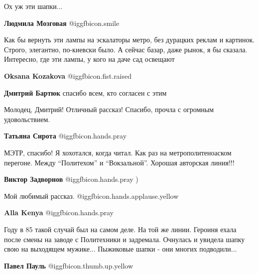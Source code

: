  
 
 
 
 
\zzSecCmt

\begin{itemize} %
Ох уж эти шапки...

\textbf{Людмила Мозговая}  @igg{fbicon.smile} 


Как бы вернуть эти лампы на эскалаторы метро, без дурацких реклам и картинок.
Строго, элегантно, по-киевски было. А сейчас базар, даже рынок, я бы сказала.
Интересно, где эти лампы, у кого на даче сад освещают

\begin{itemize} %
\textbf{Oksana Kozakova}  @igg{fbicon.fist.raised} 

\textbf{Дмитрий Бартюк} спасибо всем, кто согласен с этим
\end{itemize} %


Молодец, Дмитрий!
Отличный рассказ!
Спасибо, прочла с огромным удовольствием.

\textbf{Татьяна Сирота}  @igg{fbicon.hands.pray} 


МЭТР, спасибо! Я хохотался, когда читал. Как раз на метрополитеноаском
перегоне. Между \enquote{Политехом} и \enquote{Вокзальной}. Хорошая авторская линия!!!

\textbf{Виктор Задворнов}  @igg{fbicon.hands.pray} )

Мой любимый рассказ. @igg{fbicon.hands.applause.yellow} 

\textbf{Alla Kenya}  @igg{fbicon.hands.pray} 


Году в 85 такой случай был на самом деле. На той же линии. Героиня ехала после
смены на заводе с Политехники и задремала. Очнулась и увидела шапку свою на
выходящем мужике... Пыжиковые шапки - они многих подводили...


\textbf{Павел Пауль}  @igg{fbicon.thumb.up.yellow} 


\end{itemize}
